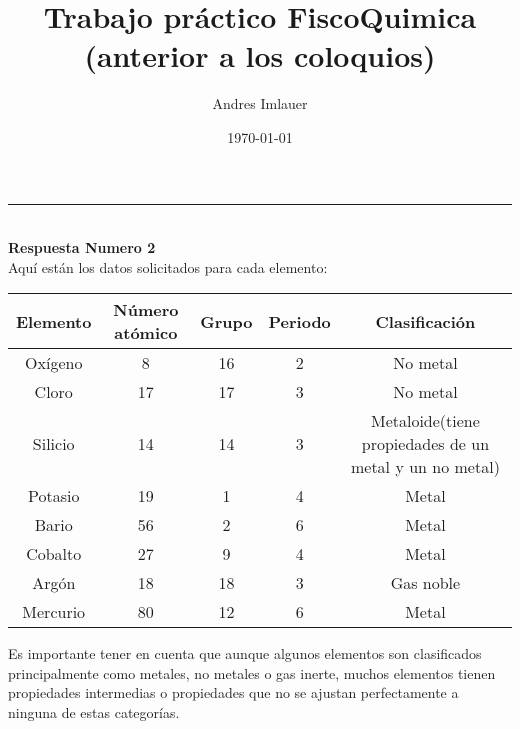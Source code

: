 \documentclass{article}
\begin{document}
\title{Trabajo práctico FiscoQuimica (anterior a los coloquios)}
\author{Andres Imlauer}
\date{\today}
\maketitle

\noindent\rule{\textwidth}{1pt} \\
\textbf{Respuesta Numero 2} \\

Aquí están los datos solicitados para cada elemento:

\begin{center}
\begin{tabular}{|c|c|c|c|c|}
\hline
Elemento & Número atómico & Grupo & Periodo & Clasificación \\ 
\hline
Oxígeno & 8 & 16 & 2 & No metal \\ 
\hline
Cloro & 17 & 17 & 3 & No metal \\ 
\hline
Silicio & 14 & 14 & 3 & Metaloide(tiene propiedades de un metal y un no metal) \\ 
\hline
Potasio & 19 & 1 & 4 & Metal \\ 
\hline
Bario & 56 & 2 & 6 & Metal \\ 
\hline
Cobalto & 27 & 9 & 4 & Metal \\ 
\hline
Argón & 18 & 18 & 3 & Gas noble \\ 
\hline
Mercurio & 80 & 12 & 6 & Metal \\ 
\hline
\end{tabular}
\end{center}
Es importante tener en cuenta que aunque algunos elementos son clasificados principalmente como metales, no metales o gas inerte, muchos elementos tienen propiedades intermedias o propiedades que no se ajustan perfectamente a ninguna de estas categorías.
\end{document}
